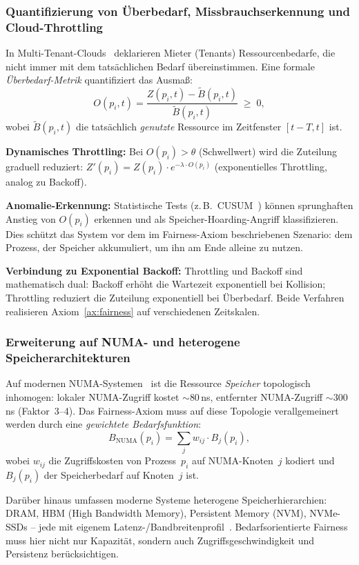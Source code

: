 ﻿\documentclass[a4paper,12pt]{article}
\theoremstyle{definition}
\begin{document}
\subsubsection{Quantifizierung von Überbedarf, Missbrauchs\-erkennung
und Cloud-Throttling}

In Multi-Tenant-Clouds~\cite{armbrust2010view} deklarieren
Mieter (Tenants) Ressourcenbedarfe, die nicht immer mit dem
tatsächlichen Bedarf übereinstimmen. Eine formale
\emph{Überbedarf-Metrik} quantifiziert das Ausmaß:
\[
  O(p_i, t) = \frac{Z(p_i, t) - \tilde{B}(p_i, t)}
                   {\tilde{B}(p_i, t)} \;\geq\; 0,
\]
wobei $\tilde{B}(p_i, t)$ die tatsächlich \emph{genutzte}
Ressource im Zeitfenster $[t-T, t]$ ist.

\textbf{Dynamisches Throttling:} Bei $O(p_i) > \theta$
(Schwellwert) wird die Zuteilung graduell reduziert:
$Z'(p_i) = Z(p_i) \cdot e^{-\lambda \cdot O(p_i)}$
(exponentielles Throttling, analog zu Backoff).

\textbf{Anomalie-Erkennung:} Statistische Tests (z.\,B.\
CUSUM~\cite{page1954continuous}) können sprunghaften Anstieg
von $O(p_i)$ erkennen und als Speicher-Hoarding-Angriff
klassifizieren. Dies schützt das System vor dem im
Fairness-Axiom beschriebenen Szenario: dem Prozess, der
Speicher akkumuliert, um ihn am Ende alleine zu nutzen.

\textbf{Verbindung zu Exponential Backoff:} Throttling und
Backoff sind mathematisch dual: Backoff erhöht die Wartezeit
exponentiell bei Kollision; Throttling reduziert die Zuteilung
exponentiell bei Überbedarf. Beide Verfahren realisieren
Axiom~\ref{ax:fairness} auf verschiedenen Zeitskalen.

\subsubsection{Erweiterung auf NUMA- und heterogene Speicher\-architekturen}

Auf modernen NUMA-Systemen~\cite{lameter2013numa} ist die
Ressource \emph{Speicher} topologisch inhomogen:
lokaler NUMA-Zugriff kostet $\sim 80$\,ns, entfernter
NUMA-Zugriff $\sim 300$\,ns (Faktor~3--4).
Das Fairness-Axiom muss auf diese Topologie verallgemeinert
werden durch eine \emph{gewichtete Bedarfsfunktion}:
\[
  B_{\mathrm{NUMA}}(p_i) = \sum_{j} w_{ij} \cdot B_j(p_i),
\]
wobei $w_{ij}$ die Zugriffskosten von Prozess~$p_i$ auf
NUMA-Knoten~$j$ kodiert und $B_j(p_i)$ der Speicherbedarf
auf Knoten~$j$ ist.

Darüber hinaus umfassen moderne Systeme heterogene
Speicherhierarchien: DRAM, HBM (High Bandwidth Memory),
Persistent Memory (NVM), NVMe-SSDs -- jede mit eigenem
Latenz-/Bandbreitenprofil~\cite{izraelevitz2019basic}.
Bedarfsorientierte Fairness muss hier nicht nur Kapazität,
sondern auch Zugriffsgeschwindigkeit und Persistenz
berücksichtigen.
\end{document}
